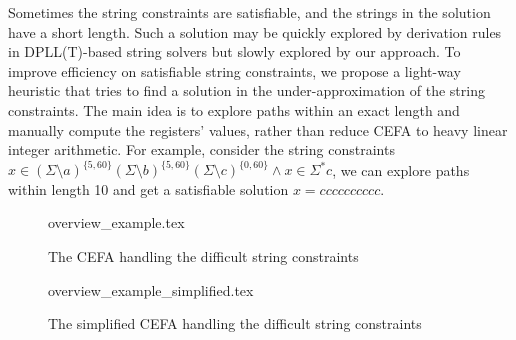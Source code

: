 {Sometimes the string constraints are satisfiable, and the strings in the solution have a short length. Such a solution may be quickly explored by derivation rules in DPLL(T)-based string solvers but slowly explored by our approach. To improve efficiency on satisfiable string constraints, we propose a light-way heuristic that tries to find a solution in the under-approximation of the string constraints. The main idea is to explore paths within an exact length and manually compute the registers' values, rather than reduce CEFA to heavy linear integer arithmetic. For example, consider the string constraints $x \in (\Sigma \setminus a)^{\{5, 60\}} (\Sigma \setminus b)^{\{5, 60\}} (\Sigma \setminus c)^{\{0, 60\}} \wedge x \in \Sigma^* c$, we can explore paths within length 10 and get a satisfiable solution $x = cccccccccc$. 
\begin{figure}[ht]
  \centering
  {overview_example.tex}
  \caption{The CEFA handling the difficult string constraints}
  \label{fig:overview:orgin}
\end{figure}
\begin{figure}[ht]
  \centering
  {overview_example_simplified.tex}
  \caption{The simplified CEFA handling the difficult string constraints}
  \label{fig:overview:simplified}
\end{figure}
}

